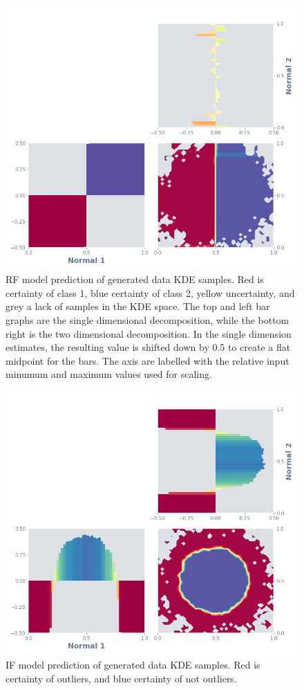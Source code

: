 \documentclass[a4paper, twocolumn]{article}
\begin{document}
\begin{figure}
\centering
\includegraphics[width=0.8\columnwidth]{img/gen_rf.png}
\caption{RF model prediction of generated data KDE samples. Red is certainty of class 1, blue certainty of class 2, yellow uncertainty, and grey a lack of samples in the KDE space. The top and left bar graphs are the single dimensional decomposition, while the bottom right is the two dimensional decomposition. In the single dimension estimates, the resulting value is shifted down by 0.5 to create a flat midpoint for the bars. The axis are labelled with the relative input minumum and maximum values used for scaling.}
\label{fig:gen-rf}
\end{figure}

\begin{figure}
\centering
\includegraphics[width=0.8\columnwidth]{img/gen_if.png}
\caption{IF model prediction of generated data KDE samples. Red is certainty of outliers, and blue certainty of not outliers.}
\label{fig:gen-if}
\end{figure}
\end{document}
